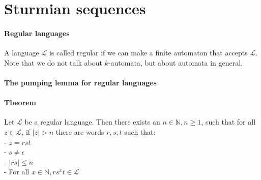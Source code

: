 \documentclass{article}
\begin{document}
\section*{Sturmian sequences}
\paragraph{Regular languages}
A language $\mathcal{L}$ is called regular if we can make a finite automaton
that accepts $\mathcal{L}$. Note that we do not talk about $k$-automata, but
about automata in general.

\paragraph{The pumping lemma for regular languages}
\paragraph{Theorem}
Let $\mathcal{L}$ be a regular language. Then there exists an
$n \in \mathbb{N}, n \ge 1$, such that for all $z \in \mathcal{L}$, if
$|z| > n$ there are words $r, s, t$ such that:\\
- $z = rst$\\
- $s \ne \epsilon$\\
- $|rs| \le n$\\
- For all $x \in \mathbb{N}, r s^x t \in \mathcal{L}$
\end{document}
